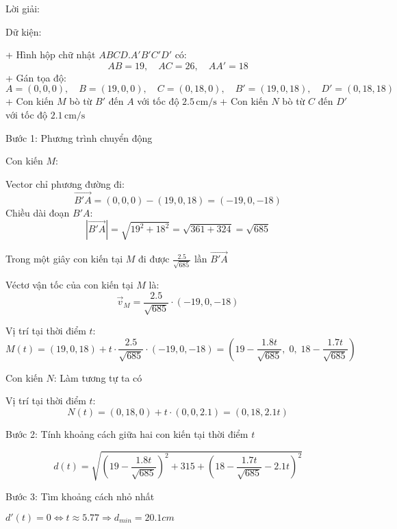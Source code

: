 \documentclass[a4paper,12pt]{article}
\begin{document}
Lời giải:

Dữ kiện:

+ Hình hộp chữ nhật \(ABCD.A'B'C'D'\) có:
\[
AB = 19,\quad AC = 26,\quad AA' = 18
\]
+ Gán tọa độ:
\[
A = (0, 0, 0),\quad B = (19, 0, 0),\quad C = (0, 18, 0),\quad B' = (19, 0, 18),\quad D' = (0, 18, 18)
\]
+ Con kiến \(M\) bò từ \(B'\) đến \(A\) với tốc độ \(2.5\, \text{cm/s}\)
+ Con kiến \(N\) bò từ \(C\) đến \(D'\) với tốc độ \(2.1\, \text{cm/s}\)

Bước 1: Phương trình chuyển động

Con kiến \(M\):

Vector chỉ phương đường đi:
\[
\overrightarrow{B'A} = (0, 0, 0) - (19, 0, 18) = ( -19, 0, -18 )
\]
Chiều dài đoạn \(B'A\):
\[
|\overrightarrow{B'A}| = \sqrt{19^2 + 18^2} = \sqrt{361 + 324} = \sqrt{685}
\]

Trong một giây con kiến tại \(M\) đi được \(\frac{2.5}{\sqrt{685}}\) lần \(\overrightarrow{B'A}\)

Véctơ vận tốc của con kiến tại \(M\) là:
\[
\overrightarrow{v}_M = \frac{2.5}{\sqrt{685}} \cdot ( -19, 0, -18 )
\]

Vị trí tại thời điểm \(t\):
\[
M(t) = (19, 0, 18) + t \cdot \frac{2.5}{\sqrt{685}} \cdot ( -19, 0, -18 )
= \left( 19 - \frac{1.8t}{\sqrt{685}},\; 0,\; 18 - \frac{1.7t}{\sqrt{685}} \right)
\]

Con kiến \(N\): Làm tương tự ta có


Vị trí tại thời điểm \(t\):
\[
N(t) = (0, 18, 0) + t \cdot (0, 0, 2.1) = (0, 18, 2.1t)
\]

Bước 2: Tính khoảng cách giữa hai con kiến tại thời điểm \(t\)

\[
d(t) = \sqrt{\left(19 - \frac{1.8t}{\sqrt{685}}\right)^2 + 315 + \left(18 - \frac{1.7t}{\sqrt{685}} - 2.1t\right)^2}
\]

Bước 3: Tìm khoảng cách nhỏ nhất

\(d'(t)=0\Leftrightarrow t \approx 5.77 \Rightarrow d_{min}=20.1cm\)
\end{document}
